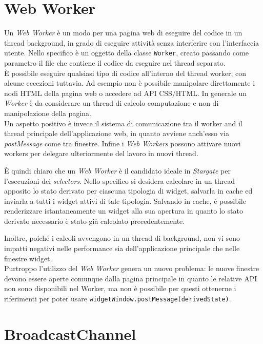 \section{Web Worker}

Un \textit{Web Worker} è un modo per una pagina web di eseguire del codice in un thread background, in grado di eseguire attività senza interferire con l'interfaccia utente. Nello specifico è un oggetto della classe \texttt{Worker}, creato passando come parametro il file che contiene il codice da eseguire nel thread separato. \\

È possibile eseguire qualsiasi tipo di codice all'interno del thread worker, con alcune eccezioni tuttavia. Ad esempio non è possibile manipolare direttamente i nodi HTML della pagina web o accedere ad API CSS/HTML. In generale un \textit{Worker} è da considerare un thread di calcolo computazione e non di manipolazione della pagina. \\

Un aspetto positivo è invece il sistema di comunicazione tra il worker and il thread principale dell'applicazione web, in quanto avviene anch'esso via \textit{postMessage} come tra finestre. Infine i \textit{Web Workers} possono attivare nuovi workers per delegare ulteriormente del lavoro in nuovi thread.

È quindi chiaro che un \textit{Web Worker} è il candidato ideale in \textit{Stargate} per l'esecuzioni dei \textit{selectors}. Nello specifico si desidera calcolare in un thread apposito lo stato derivato per ciascuna tipologia di widget, salvarla in cache ed inviarla a tutti i widget attivi di tale tipologia. Salvando in cache, è possibile renderizzare istantaneamente un widget alla sua apertura in quanto lo stato derivato necessario è stato già calcolato precedentemente.

Inoltre, poiché i calcoli avvengono in un thread di background, non vi sono impatti negativi nelle performance sia dell'applicazione principale che nelle finestre widget. \\

Purtroppo l'utilizzo del \textit{Web Worker} genera un nuovo problema: le nuove finestre devono essere aperte comunque dalla pagina principale in quanto le relative API non sono disponibili nel Worker, ma non è possibile per questi ottenerne i riferimenti per poter usare \texttt{widgetWindow.postMessage(derivedState)}. 

\section{BroadcastChannel}

